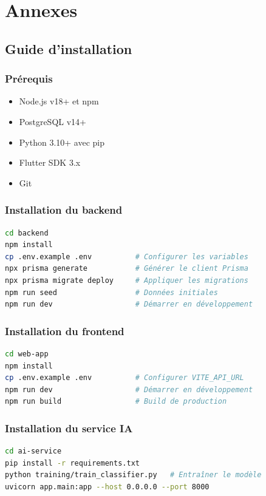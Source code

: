 \chapter{Annexes}
\label{chap:annexes}

\section{Guide d'installation}
\label{sec:guide_installation}

\subsection{Prérequis}
\begin{itemize}
    \item Node.js v18+ et npm
    \item PostgreSQL v14+
    \item Python 3.10+ avec pip
    \item Flutter SDK 3.x
    \item Git
\end{itemize}

\subsection{Installation du backend}
\begin{lstlisting}[language=bash,caption={Installation du backend}]
cd backend
npm install
cp .env.example .env          # Configurer les variables
npx prisma generate           # Générer le client Prisma
npx prisma migrate deploy     # Appliquer les migrations
npm run seed                  # Données initiales
npm run dev                   # Démarrer en développement
\end{lstlisting}

\subsection{Installation du frontend}
\begin{lstlisting}[language=bash,caption={Installation du frontend}]
cd web-app
npm install
cp .env.example .env          # Configurer VITE_API_URL
npm run dev                   # Démarrer en développement
npm run build                 # Build de production
\end{lstlisting}

\subsection{Installation du service IA}
\begin{lstlisting}[language=bash,caption={Installation du service IA}]
cd ai-service
pip install -r requirements.txt
python training/train_classifier.py   # Entraîner le modèle
uvicorn app.main:app --host 0.0.0.0 --port 8000
\end{lstlisting}

